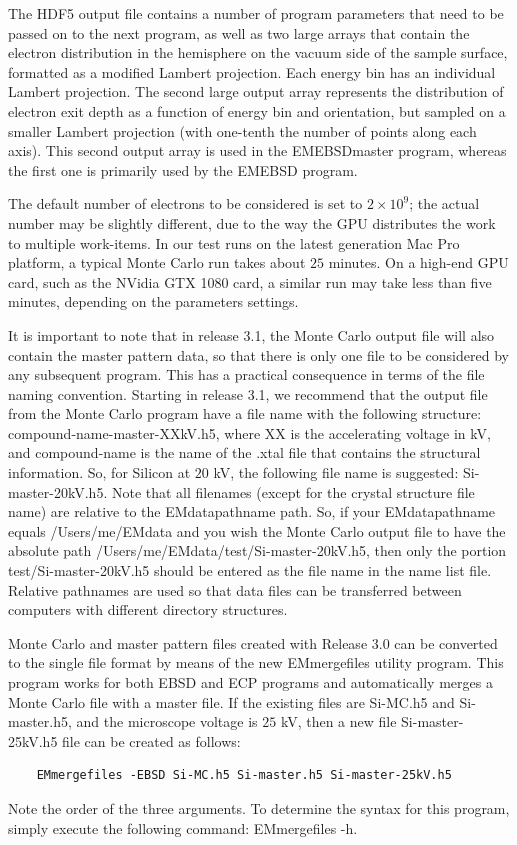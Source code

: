 \documentclass[DIV=calc, paper=letter, fontsize=11pt]{scrartcl}	 %
\begin{document}
The HDF5 output file contains a number of program parameters
that need to be passed on to the next program, as well as two large arrays that contain the electron distribution in the hemisphere on
the vacuum side of the sample surface, formatted as a modified Lambert projection.  Each energy bin has an individual Lambert 
projection.  The second large output array represents the distribution of electron exit depth as a function of energy bin and
orientation, but sampled on a smaller Lambert projection (with one-tenth the number of points along each axis).  This second output
array is used in the \textsf{EMEBSDmaster} program, whereas the first one is primarily used by the \textsf{EMEBSD} program.

The default number of electrons to be considered is set to $2\times 10^9$; the actual number may be slightly different, due 
to the way the GPU distributes the work to multiple work-items.  In our test runs on the latest generation Mac Pro platform, 
a typical Monte Carlo run takes about $25$ minutes.  On a high-end GPU card, such as the NVidia GTX 1080 card, a similar run
may take less than five minutes, depending on the parameters settings.

It is important to note that in release 3.1, the Monte Carlo output file will also contain the master pattern data, so that there is only
one file to be considered by any subsequent program.  This has a practical consequence in terms of the file naming convention.
Starting in release 3.1, we recommend that the output file from the Monte Carlo program have a file name with the following
structure: \textsf{compound-name-master-XXkV.h5}, where XX is the accelerating voltage in kV, and compound-name is the name
of the .xtal file that contains the structural information.  So, for Silicon at $20$ kV, the following file name is suggested:
\textsf{Si-master-20kV.h5}.  Note that all filenames (except for the crystal structure file name) are relative to the \textsf{EMdatapathname} path.  So, if your 
\textsf{EMdatapathname} equals \textsf{/Users/me/EMdata} and you wish the Monte Carlo output file to have the absolute path
\textsf{/Users/me/EMdata/test/Si-master-20kV.h5}, then only the portion \textsf{test/Si-master-20kV.h5} should be entered as the file name
in the name list file.  Relative pathnames are used so that data files can be transferred between computers with different directory
structures.

Monte Carlo and master pattern files created with Release 3.0 can be converted to the single file format by means of the new
\textsf{EMmergefiles} utility program.  This program works for both EBSD and ECP programs and automatically merges a
Monte Carlo file with a master file.  If the existing files are \textsf{Si-MC.h5} and \textsf{Si-master.h5}, and the microscope voltage 
is $25$ kV, then a new file \textsf{Si-master-25kV.h5} file can be created as follows:
\begin{verbatim}
	EMmergefiles -EBSD Si-MC.h5 Si-master.h5 Si-master-25kV.h5
\end{verbatim}
Note the order of the three arguments.  To determine the syntax for this 
program, simply execute the following command: \textsf{EMmergefiles -h}.
\end{document}
